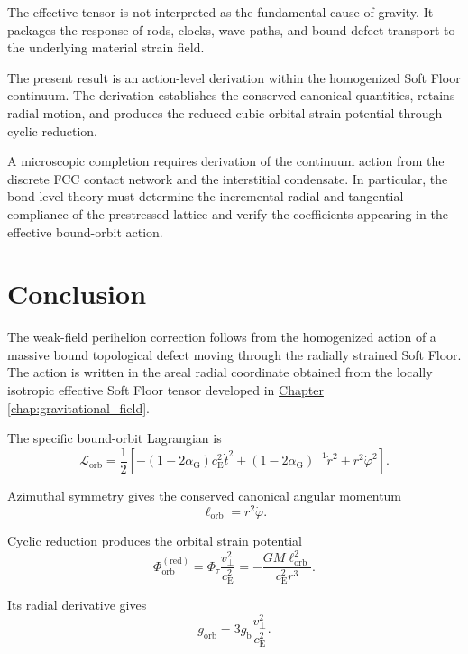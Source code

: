The effective tensor is not interpreted as the fundamental cause of gravity. It packages the response of rods, clocks, wave paths, and bound-defect transport to the underlying material strain field.

The present result is an action-level derivation within the homogenized Soft Floor continuum. The derivation establishes the conserved canonical quantities, retains radial motion, and produces the reduced cubic orbital strain potential through cyclic reduction.

A microscopic completion requires derivation of the continuum action from the discrete FCC contact network and the interstitial condensate. In particular, the bond-level theory must determine the incremental radial and tangential compliance of the prestressed lattice and verify the coefficients appearing in the effective bound-orbit action.

\section{Conclusion}

The weak-field perihelion correction follows from the homogenized action of a massive bound topological defect moving through the radially strained Soft Floor. The action is written in the areal radial coordinate obtained from the locally isotropic effective Soft Floor tensor developed in \hyperref[chap:gravitational_field]{Chapter \ref*{chap:gravitational_field}}.

The specific bound-orbit Lagrangian is
\begin{equation}
    \mathcal{L}_{\mathrm{orb}} = \frac{1}{2} \left[ - \left( 1-2\alpha_{\mathrm{G}} \right)c_{\mathrm{E}}^2\dot{t}^2 + \left( 1-2\alpha_{\mathrm{G}} \right)^{-1}\dot{r}^2 + r^2\dot{\varphi}^2 \right].
\end{equation}

Azimuthal symmetry gives the conserved canonical angular momentum
\begin{equation}
    \ell_{\mathrm{orb}} = r^2\dot{\varphi}.
\end{equation}

Cyclic reduction produces the orbital strain potential
\begin{equation}
    \Phi_{\mathrm{orb}}^{(\mathrm{red})} = \Phi_\tau \frac{v_\perp^2}{c_{\mathrm{E}}^2} = - \frac{ GM\ell_{\mathrm{orb}}^2 }{ c_{\mathrm{E}}^2r^3 }.
\end{equation}

Its radial derivative gives
\begin{equation}
    g_{\mathrm{orb}} = 3g_{\mathrm{b}} \frac{v_\perp^2}{c_{\mathrm{E}}^2}.
\end{equation}

